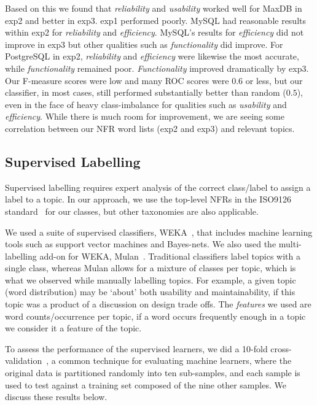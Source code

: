 \documentclass[smallextended]{svjour3}       %
\begin{document}
Based on this we found that \emph{reliability} and
\emph{usability} worked well for MaxDB in \textsf{exp2} and better in
\textsf{exp3}. 
\textsf{exp1} performed poorly.
MySQL had reasonable results within \textsf{exp2} for \emph{reliability} and \emph{efficiency}. 
MySQL's results for \emph{efficiency} did not improve in \textsf{exp3}
but other qualities such as \emph{functionality} did improve. 
For PostgreSQL in \textsf{exp2}, \emph{reliability} and \emph{efficiency} were likewise the most accurate,
while \emph{functionality} remained poor. \emph{Functionality} improved dramatically by \textsf{exp3}.
Our F-measure scores were low and many ROC scores were $0.6$ or less, but our classifier, in most cases,
still performed substantially better than random ($0.5$), even in the
face of heavy class-imbalance for qualities such as \emph{usability} 
and \emph{efficiency}. While there is much room for improvement, we are seeing some
correlation between our NFR word lists (\textsf{exp2} and \textsf{exp3}) and relevant topics.

\subsection{Supervised Labelling}
\label{sec:suplabelling}
Supervised labelling requires expert analysis of the correct
class/label to assign a label to a topic. In our approach, we use the top-level NFRs in the ISO9126 standard~\cite{iso9126} for our classes, but other
taxonomies are also applicable.%

We used a suite of supervised classifiers, WEKA~\cite{weka09},
that includes machine learning tools such as support vector machines and Bayes-nets. 
We also used the multi-labelling add-on for WEKA, Mulan~\cite{mulan}. %
Traditional classifiers label topics with a single class, whereas Mulan allows for a mixture of classes per topic, which is what we observed while
manually labelling topics. For example, a given topic (word distribution) may be `about' both usability and maintainability, if this topic was a product of a discussion on design trade offs.
The \emph{features} we used are word counts/occurrence	per topic, if
a word occurs frequently enough in a topic we consider it a feature of
the topic.

To assess the performance of the supervised learners, we did a 10-fold cross-validation~\cite{Kohavi1995}, a common technique for evaluating machine
learners, where the original data is partitioned randomly into ten sub-samples, and each sample is used to test against a training set composed of the nine other samples.
We discuss these results below.%
\end{document}
